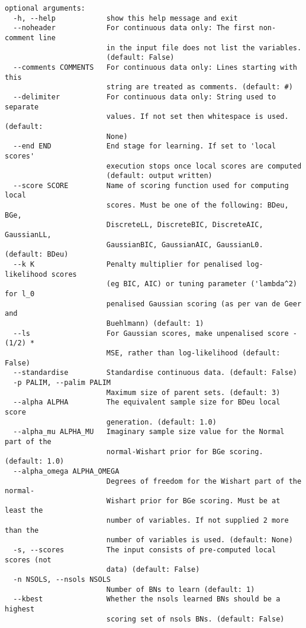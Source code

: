 \documentclass{article}
\begin{document}
\begin{verbatim}
optional arguments:
  -h, --help            show this help message and exit
  --noheader            For continuous data only: The first non-comment line
                        in the input file does not list the variables.
                        (default: False)
  --comments COMMENTS   For continuous data only: Lines starting with this
                        string are treated as comments. (default: #)
  --delimiter           For continuous data only: String used to separate
                        values. If not set then whitespace is used. (default:
                        None)
  --end END             End stage for learning. If set to 'local scores'
                        execution stops once local scores are computed
                        (default: output written)
  --score SCORE         Name of scoring function used for computing local
                        scores. Must be one of the following: BDeu, BGe,
                        DiscreteLL, DiscreteBIC, DiscreteAIC, GaussianLL,
                        GaussianBIC, GaussianAIC, GaussianL0. (default: BDeu)
  --k K                 Penalty multiplier for penalised log-likelihood scores
                        (eg BIC, AIC) or tuning parameter ('lambda^2) for l_0
                        penalised Gaussian scoring (as per van de Geer and
                        Buehlmann) (default: 1)
  --ls                  For Gaussian scores, make unpenalised score -(1/2) *
                        MSE, rather than log-likelihood (default: False)
  --standardise         Standardise continuous data. (default: False)
  -p PALIM, --palim PALIM
                        Maximum size of parent sets. (default: 3)
  --alpha ALPHA         The equivalent sample size for BDeu local score
                        generation. (default: 1.0)
  --alpha_mu ALPHA_MU   Imaginary sample size value for the Normal part of the
                        normal-Wishart prior for BGe scoring. (default: 1.0)
  --alpha_omega ALPHA_OMEGA
                        Degrees of freedom for the Wishart part of the normal-
                        Wishart prior for BGe scoring. Must be at least the
                        number of variables. If not supplied 2 more than the
                        number of variables is used. (default: None)
  -s, --scores          The input consists of pre-computed local scores (not
                        data) (default: False)
  -n NSOLS, --nsols NSOLS
                        Number of BNs to learn (default: 1)
  --kbest               Whether the nsols learned BNs should be a highest
                        scoring set of nsols BNs. (default: False)

\end{verbatim}
\end{document}
